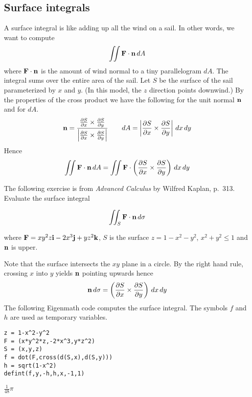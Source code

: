 
\subsection{Surface integrals}
A surface integral is like adding up all the wind on a sail.
In other words, we want to compute
$$\int\!\!\!\int{\bf F\cdot n}\,dA$$
where ${\bf F\cdot n}$ is the amount of wind normal to a tiny parallelogram $dA$.
The integral sums over the entire area of the sail.
Let $S$ be the surface of the sail parameterized by $x$ and $y$.
(In this model, the $z$ direction points downwind.)
By the properties of the cross product we have the following for the unit normal $\bf n$
and for $dA$.
$${\bf n}={ {{\partial S\over\partial x}\times{\partial S\over\partial y}}\over
 {\left|{\partial S\over\partial x}\times{\partial S\over\partial y}\right|}}\qquad
dA=\left|{\partial S\over\partial x}\times{\partial S\over\partial y}\right|\,dx\,dy$$
Hence
$$\int\!\!\!\int{\bf F\cdot n}\,dA=\int\!\!\!\int{\bf F}\cdot
\left({{\partial S\over\partial x}\times{\partial S\over\partial y}}\right)\,dx\,dy$$

The following exercise is from
{\it Advanced Calculus} by Wilfred Kaplan, p.~313.
Evaluate the surface integral

$$\int\!\!\!\int_S{\bf F\cdot n}\,d\sigma$$

where ${\bf F}=xy^2z{\bf i}-2x^3{\bf j}+yz^2{\bf k}$, $S$ is the surface
$z=1-x^2-y^2$, $x^2+y^2\le1$ and $\bf n$ is upper.

Note that the surface intersects the $xy$ plane in a circle.
By the right hand rule, crossing $x$ into $y$ yields $\bf n$ pointing upwards hence
$${\bf n}\,d\sigma=\left({{\partial S\over\partial x}\times{\partial S\over\partial y}}\right)\,dx\,dy$$
The following Eigenmath code computes the surface integral.
The symbols $f$ and $h$ are used as temporary variables.

\begin{Verbatim}[formatcom=\color{blue},samepage=true]
z = 1-x^2-y^2
F = (x*y^2*z,-2*x^3,y*z^2)
S = (x,y,z)
f = dot(F,cross(d(S,x),d(S,y)))
h = sqrt(1-x^2)
defint(f,y,-h,h,x,-1,1)
\end{Verbatim}

$\displaystyle \frac{1}{48}\pi$
